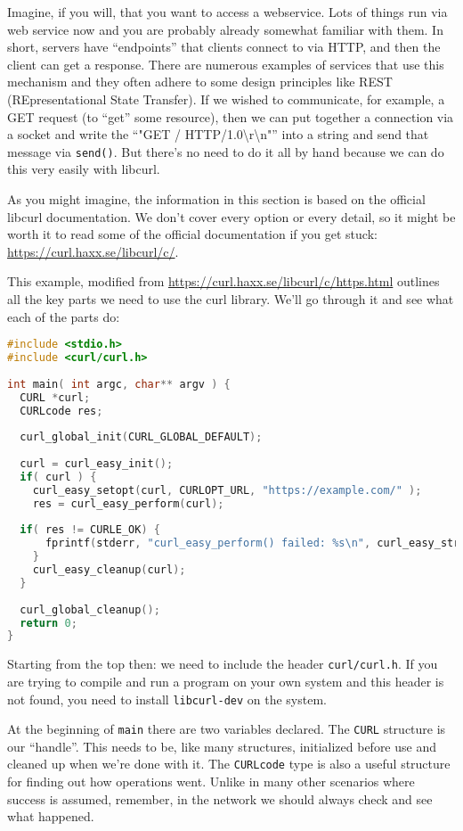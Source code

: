 Imagine, if you will, that you want to access a webservice. Lots of things run via web service now and you are probably already somewhat familiar with them. In short, servers have ``endpoints'' that clients connect to via HTTP, and then the client can get a response. There are numerous examples of services that use this mechanism and they often adhere to some design principles like REST (REpresentational State Transfer). If we wished to communicate, for example, a GET request (to ``get'' some resource), then we can put together a connection via a socket and write the ``"GET / HTTP/1.0\textbackslash r\textbackslash n"'' into a string and send that message via \texttt{send()}. But there's no need to do it all by hand because we can do this very easily with libcurl.

As you might imagine, the information in this section is based on the official libcurl documentation. We don't cover every option or every detail, so it might be worth it to read some of the official documentation if you get stuck: \url{https://curl.haxx.se/libcurl/c/}.

This example, modified from \url{https://curl.haxx.se/libcurl/c/https.html} outlines all the key parts we need to use the curl library. We'll go through it and see what each of the parts do:

\begin{lstlisting}[language=C]
#include <stdio.h>
#include <curl/curl.h>
 
int main( int argc, char** argv ) {
  CURL *curl;
  CURLcode res;
 
  curl_global_init(CURL_GLOBAL_DEFAULT);
 
  curl = curl_easy_init();
  if( curl ) {
    curl_easy_setopt(curl, CURLOPT_URL, "https://example.com/" );
    res = curl_easy_perform(curl);
    
  if( res != CURLE_OK) {
      fprintf(stderr, "curl_easy_perform() failed: %s\n", curl_easy_strerror(res));
    }
    curl_easy_cleanup(curl);
  }
 
  curl_global_cleanup();
  return 0;
}
\end{lstlisting}

Starting from the top then: we need to include the header \texttt{curl/curl.h}. If you are trying to compile and run a program on your own system and this header is not found, you need to install \texttt{libcurl-dev} on the system. 

At the beginning of \texttt{main} there are two variables declared. The \texttt{CURL} structure is our ``handle''. This needs to be, like many structures, initialized before use and cleaned up when we're done with it. The \texttt{CURLcode} type is also a useful structure for finding out how operations went. Unlike in many other scenarios where success is assumed, remember, in the network we should always check and see what happened.

